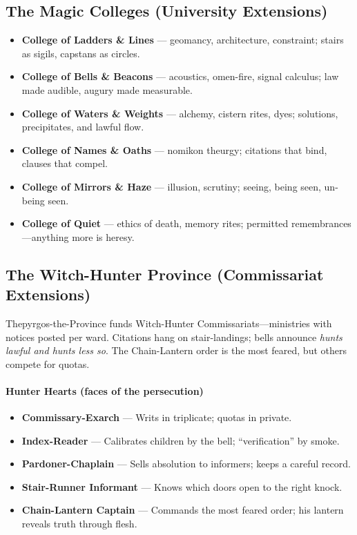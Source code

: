 \subsection*{The Magic Colleges (University Extensions)}
\label{sec:thepyrgos-colleges}
\begin{itemize}
\item \textbf{College of Ladders \& Lines} --- geomancy, architecture, constraint; stairs as sigils, capstans as circles.
\item \textbf{College of Bells \& Beacons} --- acoustics, omen-fire, signal calculus; law made audible, augury made measurable.
\item \textbf{College of Waters \& Weights} --- alchemy, cistern rites, dyes; solutions, precipitates, and lawful flow.
\item \textbf{College of Names \& Oaths} --- nomikon theurgy; citations that bind, clauses that compel.
\item \textbf{College of Mirrors \& Haze} --- illusion, scrutiny; seeing, being seen, un-being seen.
\item \textbf{College of Quiet} --- ethics of death, memory rites; permitted remembrances---anything more is heresy.
\end{itemize}

\subsection*{The Witch-Hunter Province (Commissariat Extensions)}
\label{sec:thepyrgos-hunters}
Thepyrgos-the-Province funds Witch-Hunter Commissariats---ministries with notices posted per ward. Citations hang on stair-landings; bells announce \emph{hunts lawful and hunts less so}. The Chain-Lantern order is the most feared, but others compete for quotas.

\paragraph{Hunter Hearts (faces of the persecution)}
\begin{itemize}
\item \textbf{Commissary-Exarch} --- Writs in triplicate; quotas in private.
\item \textbf{Index-Reader} --- Calibrates children by the bell; ``verification'' by smoke.
\item \textbf{Pardoner-Chaplain} --- Sells absolution to informers; keeps a careful record.
\item \textbf{Stair-Runner Informant} --- Knows which doors open to the right knock.
\item \textbf{Chain-Lantern Captain} --- Commands the most feared order; his lantern reveals truth through flesh.
\end{itemize}

